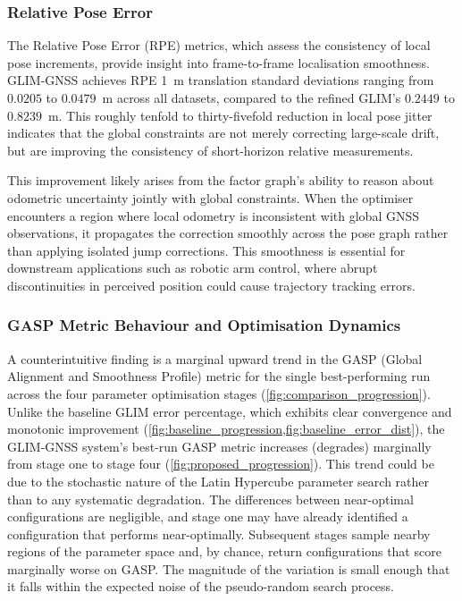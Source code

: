 \subsubsection{Relative Pose Error}

The Relative Pose Error (RPE) metrics, which assess the consistency of local pose increments, provide insight into frame-to-frame localisation smoothness. GLIM-GNSS achieves RPE 1~m translation standard deviations ranging from $0.0205$ to $0.0479$~m across all datasets, compared to the refined GLIM's $0.2449$ to $0.8239$~m. This roughly tenfold to thirty-fivefold reduction in local pose jitter indicates that the global constraints are not merely correcting large-scale drift, but are improving the consistency of short-horizon relative measurements.

This improvement likely arises from the factor graph's ability to reason about odometric uncertainty jointly with global constraints. When the optimiser encounters a region where local odometry is inconsistent with global GNSS observations, it propagates the correction smoothly across the pose graph rather than applying isolated jump corrections. This smoothness is essential for downstream applications such as robotic arm control, where abrupt discontinuities in perceived position could cause trajectory tracking errors.

\subsubsection{GASP Metric Behaviour and Optimisation Dynamics}

A counterintuitive finding is a marginal upward trend in the GASP (Global Alignment and Smoothness Profile) metric for the single best-performing run across the four parameter optimisation stages (\cref{fig:comparison_progression}). Unlike the baseline GLIM error percentage, which exhibits clear convergence and monotonic improvement (\cref{fig:baseline_progression,fig:baseline_error_dist}), the GLIM-GNSS system's best-run GASP metric increases (degrades) marginally from stage one to stage four (\cref{fig:proposed_progression}). This trend could be due to the stochastic nature of the Latin Hypercube parameter search rather than to any systematic degradation. The differences between near-optimal configurations are negligible, and stage one may have already identified a configuration that performs near-optimally. Subsequent stages sample nearby regions of the parameter space and, by chance, return configurations that score marginally worse on GASP. The magnitude of the variation is small enough that it falls within the expected noise of the pseudo-random search process.

